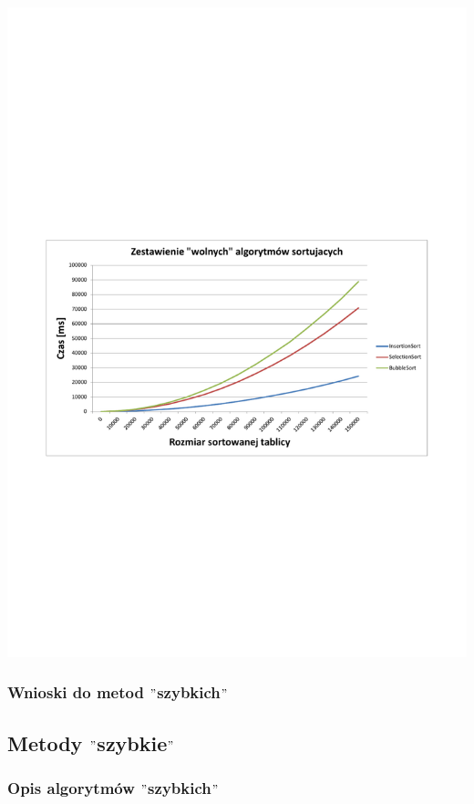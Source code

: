 \documentclass[polish,polish,a4paper]{article}
\begin{document}
\begin{spacing}{1.5}
	\begin{minipage}[H]{\textwidth}
		\begin{center}
					\includegraphics[scale=0.85]{zad2wolne.pdf}
					\label{fig:zad2wolne}
		\end{center}
	\end{minipage}

\subsubsection{Wnioski do metod $"$szybkich$"$}
	
	\subsection{Metody $"$szybkie$"$}

	\subsubsection{Opis algorytmów $"$szybkich$"$}


\end{spacing}
\end{document}
